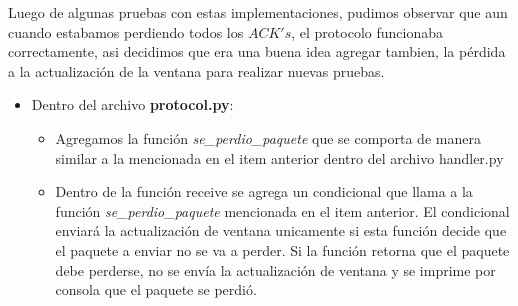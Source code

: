Luego de algunas pruebas con estas implementaciones, pudimos observar que aun cuando estabamos perdiendo todos los $ACK's$, el protocolo funcionaba correctamente, asi decidimos que era una buena idea agregar tambien, la p\'erdida a la actualizaci\'on de la ventana para realizar nuevas pruebas.

\begin{itemize}

\item Dentro del archivo \textbf{protocol.py}:

\begin{itemize}

\item Agregamos la funci\'on \textit{se\_perdio\_paquete} que se comporta de manera similar a la mencionada en el item anterior dentro del archivo handler.py

\item Dentro de la función receive se agrega un condicional que llama a la funci\'on \textit{se\_perdio\_paquete} mencionada en el item anterior. El condicional enviar\'a la actualizaci\'on de ventana unicamente si esta funci\'on decide que el paquete a enviar no se va a perder. Si la funci\'on retorna que el paquete debe perderse, no se env\'ia la actualizaci\'on de ventana y se imprime por consola que el paquete se perdi\'o.


\end{itemize}

\end{itemize}
 